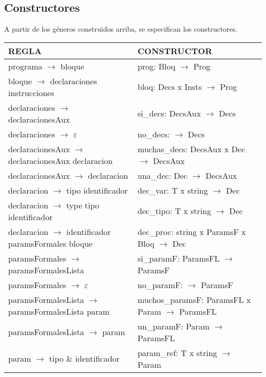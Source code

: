 \documentclass[11pt]{article}
\begin{document}
    \subsection{Constructores}
    A partir de los géneros construidos arriba, se especifican los constructores.
    \begin{center}
    \begin{longtable}{|p{7cm}|p{7cm}|} 
        \hline
        \textbf{REGLA} & \textbf{CONSTRUCTOR} \\
        \hline
        programa $\rightarrow$ bloque & prog: Bloq $\rightarrow$ Prog \\
        \hline
        bloque $\rightarrow$ declaraciones instrucciones & bloq: Decs x Insts $\rightarrow$ Prog \\
        \hline
        declaraciones $\rightarrow$ declaracionesAux & si\_decs: DecsAux $\rightarrow$ Decs \\
        \hline
        declaraciones $\rightarrow$ $\varepsilon$ & no\_decs: $\rightarrow$ Decs \\
        \hline
        declaracionesAux $\rightarrow$ declaracionesAux declaracion & muchas\_decs: DecsAux x Dec $\rightarrow$ DecsAux \\
        \hline
        declaracionesAux $\rightarrow$ declaracion & una\_dec: Dec $\rightarrow$ DecsAux \\
        \hline
        declaracion $\rightarrow$ tipo identificador & dec\_var: T x string $\rightarrow$ Dec \\
        \hline
        declaracion $\rightarrow$ type tipo identificador & dec\_tipo: T x string $\rightarrow$ Dec \\
        \hline
        declaracion $\rightarrow$ identificador paramsFormales bloque & dec\_proc: string x ParamsF x Bloq $\rightarrow$ Dec \\
        \hline
        paramsFormales $\rightarrow$ paramsFormalesLista & si\_paramF: ParamsFL $\rightarrow$ ParamsF \\
        \hline
        paramsFormales $\rightarrow$ $\varepsilon$ & no\_paramF: $\rightarrow$ ParamsF \\
        \hline
        paramsFormalesLista $\rightarrow$ paramsFormalesLista param & muchos\_paramsF: ParamsFL x Param $\rightarrow$ ParamsFL \\
        \hline
        paramsFormalesLista $\rightarrow$ param & un\_paramF: Param $\rightarrow$ ParamsFL \\
        \hline
        param $\rightarrow$ tipo \& identificador & param\_ref: T x string $\rightarrow$ Param \\

\end{longtable}
\end{center}
\end{document}
